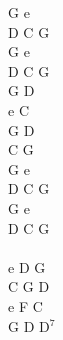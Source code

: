 \documentclass[a5paper, 10pt]{book}
\begin{document}
\begin{minipage}[t]{0.15\textwidth}
  G e\\
  D C G\\
  G e\\
  D C G\\

  G D\\
  e C\\
  G D\\
  C G\\

  G e\\
  D C G\\
  G e\\
  D C G\\

  ~\\

  e D G\\
  C G D\\
  e F C\\
  G D D$^7$\\

\end{minipage}





\newpage
\end{document}
